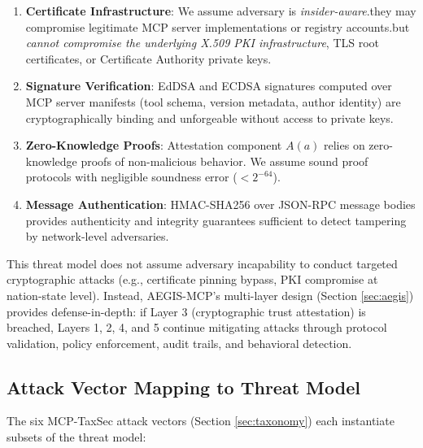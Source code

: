 \documentclass[12pt,twocolumn,journal]{IEEEtran}
\begin{document}
\begin{enumerate}
\item \textbf{Certificate Infrastructure}: We assume adversary is \textit{insider-aware}.they may compromise legitimate MCP server implementations or registry accounts.but \textit{cannot compromise the underlying X.509 PKI infrastructure}, TLS root certificates, or Certificate Authority private keys.

\item \textbf{Signature Verification}: EdDSA and ECDSA signatures computed over MCP server manifests (tool schema, version metadata, author identity) are cryptographically binding and unforgeable without access to private keys.

\item \textbf{Zero-Knowledge Proofs}: Attestation component $A(a)$ relies on zero-knowledge proofs of non-malicious behavior. We assume sound proof protocols with negligible soundness error ($< 2^{-64}$).

\item \textbf{Message Authentication}: HMAC-SHA256 over JSON-RPC message bodies provides authenticity and integrity guarantees sufficient to detect tampering by network-level adversaries.
\end{enumerate}

This threat model does not assume adversary incapability to conduct targeted cryptographic attacks (e.g., certificate pinning bypass, PKI compromise at nation-state level). Instead, AEGIS-MCP's multi-layer design (Section \ref{sec:aegis}) provides defense-in-depth: if Layer 3 (cryptographic trust attestation) is breached, Layers 1, 2, 4, and 5 continue mitigating attacks through protocol validation, policy enforcement, audit trails, and behavioral detection.

\subsection{Attack Vector Mapping to Threat Model}

The six MCP-TaxSec attack vectors (Section \ref{sec:taxonomy}) each instantiate subsets of the threat model:
\end{document}
